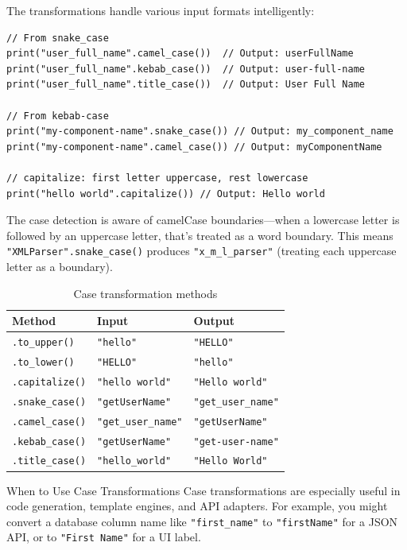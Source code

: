 The transformations handle various input formats intelligently:

\begin{lstlisting}[language=Lattice, caption={Cross-format conversion}]
// From snake_case
print("user_full_name".camel_case())  // Output: userFullName
print("user_full_name".kebab_case())  // Output: user-full-name
print("user_full_name".title_case())  // Output: User Full Name

// From kebab-case
print("my-component-name".snake_case()) // Output: my_component_name
print("my-component-name".camel_case()) // Output: myComponentName

// capitalize: first letter uppercase, rest lowercase
print("hello world".capitalize()) // Output: Hello world
\end{lstlisting}

The case detection is aware of camelCase boundaries---when a lowercase letter is followed by an uppercase letter, that's treated as a word boundary. This means \lstinline|"XMLParser".snake_case()| produces \lstinline|"x_m_l_parser"| (treating each uppercase letter as a boundary).

\begin{table}[ht]
\centering
\begin{tabular}{lll}
\toprule
\textbf{Method} & \textbf{Input} & \textbf{Output} \\
\midrule
\lstinline|.to_upper()| & \lstinline|"hello"| & \lstinline|"HELLO"| \\
\lstinline|.to_lower()| & \lstinline|"HELLO"| & \lstinline|"hello"| \\
\lstinline|.capitalize()| & \lstinline|"hello world"| & \lstinline|"Hello world"| \\
\lstinline|.snake_case()| & \lstinline|"getUserName"| & \lstinline|"get_user_name"| \\
\lstinline|.camel_case()| & \lstinline|"get_user_name"| & \lstinline|"getUserName"| \\
\lstinline|.kebab_case()| & \lstinline|"getUserName"| & \lstinline|"get-user-name"| \\
\lstinline|.title_case()| & \lstinline|"hello_world"| & \lstinline|"Hello World"| \\
\bottomrule
\end{tabular}
\caption{Case transformation methods}\label{tab:case-transformations}
\end{table}

\begin{tipbox}{When to Use Case Transformations}
Case transformations are especially useful in code generation, template engines, and API adapters. For example, you might convert a database column name like \lstinline|"first_name"| to \lstinline|"firstName"| for a JSON API, or to \lstinline|"First Name"| for a UI label.
\end{tipbox}

